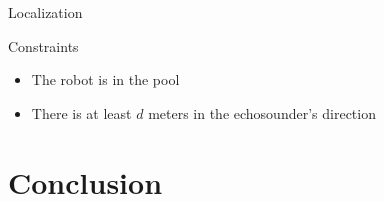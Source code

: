 \documentclass[10pt, xcolor={usenames, dvipsnames}]{beamer}
\begin{document}
            \begin{frame}{Localization}
                \begin{minipage}[c]{.55\textwidth}
                    \begin{alertblock}{Constraints}
                        \vspace{0.25cm}
                        \begin{itemize}
                            \item<2-> The robot is in the pool
                            \item<3-> There is at least $d$ meters in the echosounder's direction
                        \end{itemize}
                    \end{alertblock}
                \end{minipage}%
                \hfill
                \begin{minipage}[c]{.45\textwidth}
                    \centering
                    \begin{figure}
                        \begin{overprint}
                            \centerline{}
                            \centerline{}
                            \centerline{}
                        \end{overprint}
                        \caption{}
                   \end{figure}
                \end{minipage}
            \end{frame}

    \section{Conclusion}
\end{document}

